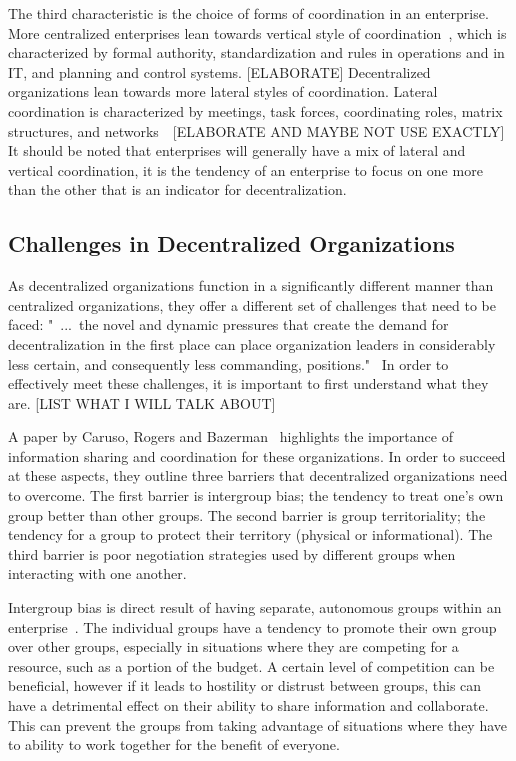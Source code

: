 The third characteristic is the choice of forms of coordination in an enterprise. More centralized enterprises lean towards vertical style of coordination~\cite{Bolman2008}, which is characterized by formal authority, standardization and rules in operations and in IT, and planning and control systems. [ELABORATE] Decentralized organizations lean towards more lateral styles of coordination. Lateral coordination is characterized by meetings, task forces, coordinating roles, matrix structures, and networks~~\cite{Bolman2008}[ELABORATE AND MAYBE NOT USE EXACTLY] It should be noted that enterprises will generally have a mix of lateral and vertical coordination, it is the tendency of an enterprise to focus on one more than the other that is an indicator for decentralization. 

\subsection{Challenges in Decentralized Organizations}

As decentralized organizations function in a significantly different manner than centralized organizations, they offer a different set of challenges that need to be faced: "~...~the novel and dynamic pressures that create the demand for decentralization in the first place can place organization leaders in considerably less certain, and consequently less commanding, positions."~\cite{caruso2008boundaries} In order to effectively meet these challenges, it is important to first understand what they are. [LIST WHAT I WILL TALK ABOUT]

A paper by Caruso, Rogers and Bazerman~\cite{caruso2008boundaries} highlights the importance of information sharing and coordination for these organizations. In order to succeed at these aspects, they outline three barriers that decentralized organizations need to overcome. The first barrier is intergroup bias; the tendency to treat one's own group better than other groups. The second barrier is group territoriality; the tendency for a group to protect their territory (physical or informational). The third barrier is poor negotiation strategies used by different groups when interacting with one another. 

Intergroup bias is direct result of having separate, autonomous groups within an enterprise~\cite{caruso2008boundaries}. The individual groups have a tendency to promote their own group over other groups, especially in situations where they are competing for a resource, such as a portion of the budget. A certain level of competition can be beneficial, however if it leads to hostility or distrust between groups, this can have a detrimental effect on their ability to share information and collaborate. This can prevent the groups from taking advantage of situations where they have to ability to work together for the benefit of everyone. 

